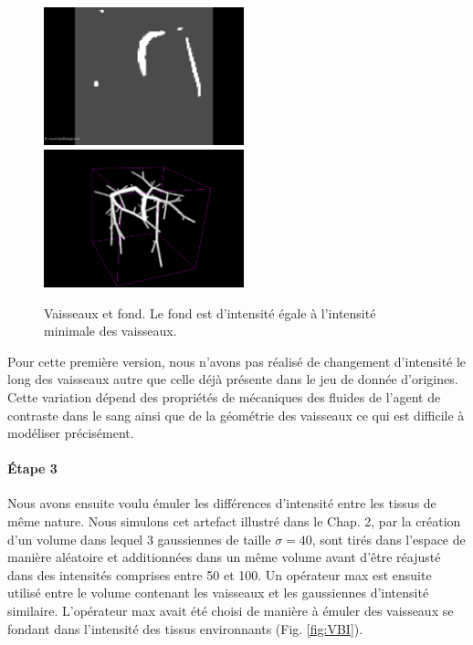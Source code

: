 \begin{figure}[h]
  \centering
  \includegraphics[height=4cm]{Images/2D_VB.png}
  \includegraphics[height=4cm]{Images/3D_VB.png}
  \label{fig:VB}
  \caption{Vaisseaux et fond. Le fond est d'intensité égale à l'intensité minimale des vaisseaux.}
\end{figure}

Pour cette première version, nous n'avons pas réalisé de changement d'intensité le long des vaisseaux autre que celle déjà présente dans le jeu de donnée d'origines. Cette variation dépend des propriétés de mécaniques des fluides de l'agent de contraste dans le sang ainsi que de la géométrie des vaisseaux ce qui est difficile à modéliser précisément.

\paragraph{Étape 3}
Nous avons ensuite voulu émuler les différences d'intensité entre les tissus de même nature. Nous simulons cet artefact illustré dans le Chap. 2, par la création d'un volume dans lequel 3 gaussiennes de taille $\sigma=40$, sont tirés dans l'espace de manière aléatoire et additionnées dans un même volume avant d'être réajusté dans des intensités comprises entre 50 et 100. Un opérateur max est ensuite utilisé entre le volume contenant les vaisseaux et les gaussiennes d'intensité similaire. L'opérateur max avait été choisi de manière à émuler des vaisseaux se fondant dans l'intensité des tissus environnants (Fig. \ref{fig:VBI}).

